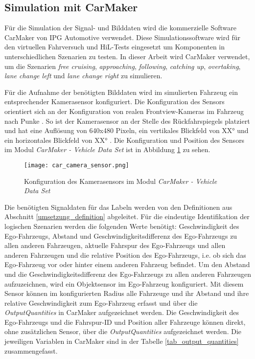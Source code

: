 \subsection{Simulation mit CarMaker}
\label{umsetzung_daten_synth_simulation}

Für die Simulation der Signal- und Bilddaten wird die kommerzielle Software CarMaker von IPG Automotive \cite{ipg2018carmaker} verwendet. Diese Simulationssoftware wird für den virtuellen Fahrversuch und \ac{HiL}-Tests eingesetzt um Komponenten in unterschiedlichen Szenarien zu testen. In dieser Arbeit wird CarMaker verwendet, um die Szenarien \textit{free cruising}, \textit{approaching}, \textit{following}, \textit{catching up}, \textit{overtaking}, \textit{lane change left} und \textit{lane change right} zu simulieren.

Für die Aufnahme der benötigten Bilddaten wird im simulierten Fahrzeug ein entsprechender Kamerasensor konfiguriert. Die Konfiguration des Sensors orientiert sich an der Konfiguration von realen Frontview-Kameras im Fahrzeug nach Punke \cite{punke2015kamera}. So ist der Kamerasensor an der Stelle des Rückfahrspiegels platziert und hat eine Auflösung von 640x480 Pixeln, ein vertikales Blickfeld von XX° und ein horizontales Blickfeld von XX° . Die Konfiguration und Position des Sensors im Modul \textit{CarMaker - Vehicle Data Set} ist in Abbildung \ref{fig_car_camera_sensor} zu sehen.

\begin{figure}[h]
\centering
\texttt{[image: car\_camera\_sensor.png]}
\caption{Konfiguration des Kamerasensors im Modul \textit{CarMaker - Vehicle Data Set} \cite{ipg2018carmaker}}
\label{fig_car_camera_sensor}
\end{figure}

Die benötigten Signaldaten für das Labeln werden von den Definitionen aus Abschnitt \ref{umsetzung_definition} abgeleitet. Für die eindeutige Identifikation der logischen Szenarien werden die folgenden Werte benötigt: Geschwindigkeit des Ego-Fahrzeugs, Abstand und Geschwindigkeitsdifferenz des Ego-Fahrzeugs zu allen anderen Fahrzeugen, aktuelle Fahrspur des Ego-Fahrzeugs und allen anderen Fahrzeugen und die relative Position des Ego-Fahrzeugs, i.e. ob sich das Ego-Fahrzeug vor oder hinter einem anderen Fahrzeug befindet. Um den Abstand und die Geschwindigkeitsdifferenz des Ego-Fahrzeugs zu allen anderen Fahrzeugen aufzuzeichnen, wird ein Objektsensor im Ego-Fahrzeug konfiguriert. Mit diesem Sensor können im konfigurierten Radius alle Fahrzeuge und ihr Abstand und ihre relative Geschwindigkeit zum Ego-Fahrzeug erfasst und über die \textit{OutputQuantities} in CarMaker aufgezeichnet werden. Die Geschwindigkeit des Ego-Fahrzeugs und die Fahrspur-ID und Position aller Fahrzeuge können direkt, ohne zusätzlichen Sensor, über die \textit{OutputQuantities} aufgezeichnet werden. Die jeweiligen Variablen in CarMaker sind in der Tabelle \ref{tab_output_quantities} zusammengefasst.

